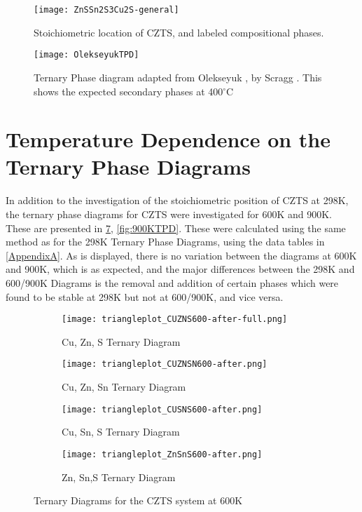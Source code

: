 \begin{figure}
\centering
 \texttt{[image: ZnSSn2S3Cu2S-general]}
    \caption{Stoichiometric location of CZTS, and labeled compositional phases.}
    \label{fig:ZnSSn2S3Cu2S}
\end{figure}
\begin{figure}
\centering
 \texttt{[image: OlekseyukTPD]}
 \caption{Ternary Phase diagram adapted from Olekseyuk \citep{Olekseyuk2004}, by Scragg \citep{scragg2011copper}. This shows the expected secondary phases at 400$^\circ$C}
    \label{fig:Olekseyuk}
\end{figure}


\section{Temperature Dependence on the Ternary Phase Diagrams}

In addition to the investigation of the stoichiometric position of CZTS at 298K, the ternary phase diagrams for CZTS were investigated for 600K and 900K. These are presented in 
\ref{fig:600KTPD}, \ref{fig:900KTPD}. These were calculated using the same method as for the 298K Ternary Phase Diagrams, using the data tables in \ref{AppendixA}. As is displayed, there is no variation between the diagrams at 600K and 900K, which is as expected, and the major differences between the 298K and 600/900K Diagrams is the removal and addition of certain phases which were found to be stable at 298K but not at 600/900K, and vice versa. 



\begin{figure}[ht]
\centering
\begin{subfigure}{70mm}
  \centering
    \texttt{[image: triangleplot\_CUZNS600-after-full.png]}
    \caption{Cu, Zn, S Ternary Diagram}
    \label{fig:CuZnS600K}
\end{subfigure}%
\begin{subfigure}{70mm}
 \centering
    \texttt{[image: triangleplot\_CUZNSN600-after.png]}
    \caption{Cu, Zn, Sn Ternary Diagram}
    \label{fig:CuZnSn600K}
\end{subfigure}
\begin{subfigure}{70mm}
 \centering
    \texttt{[image: triangleplot\_CUSNS600-after.png]}
    \caption{Cu, Sn, S Ternary Diagram}
    \label{fig:CuSnS600K}
\end{subfigure}
\begin{subfigure}{70mm}
 \centering
    \texttt{[image: triangleplot\_ZnSnS600-after.png]}
    \caption{Zn, Sn,S Ternary Diagram}
    \label{fig:ZnSnS600K}
\end{subfigure}
\caption{Ternary Diagrams for the CZTS system at 600K}
\label{fig:600KTPD}
\end{figure}


